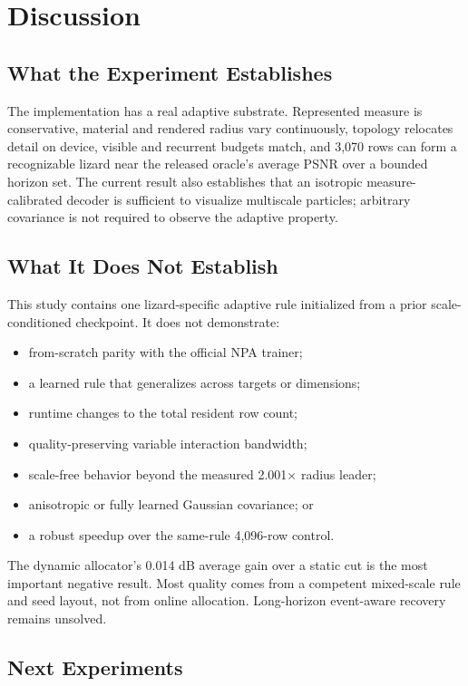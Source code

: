 \documentclass[sigconf,nonacm]{acmart}
\begin{document}
\section{Discussion}

\subsection{What the Experiment Establishes}

The implementation has a real adaptive substrate. Represented measure is
conservative, material and rendered radius vary continuously, topology
relocates detail on device, visible and recurrent budgets match, and 3,070
rows can form a recognizable lizard near the released oracle's average PSNR
over a bounded horizon set. The current result also establishes that an
isotropic measure-calibrated decoder is sufficient to visualize multiscale
particles; arbitrary covariance is not required to observe the adaptive
property.

\subsection{What It Does Not Establish}

This study contains one lizard-specific adaptive rule initialized from a prior
scale-conditioned checkpoint. It does not demonstrate:
\begin{itemize}
  \item from-scratch parity with the official NPA trainer;
  \item a learned rule that generalizes across targets or dimensions;
  \item runtime changes to the total resident row count;
  \item quality-preserving variable interaction bandwidth;
  \item scale-free behavior beyond the measured 2.001$\times$ radius leader;
  \item anisotropic or fully learned Gaussian covariance; or
  \item a robust speedup over the same-rule 4,096-row control.
\end{itemize}
The dynamic allocator's 0.014 dB average gain over a static cut is the most
important negative result. Most quality comes from a competent mixed-scale
rule and seed layout, not from online allocation. Long-horizon event-aware
recovery remains unsolved.

\subsection{Next Experiments}
\end{document}
